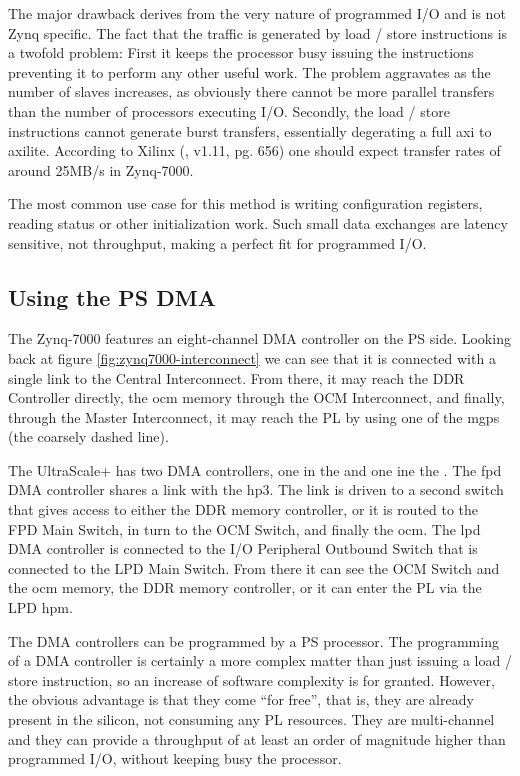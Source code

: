 The major drawback derives from the very nature of programmed I/O and is not Zynq specific.
The fact that the traffic is generated by load / store instructions is a twofold problem:
First it keeps the processor busy issuing the instructions preventing it 
to perform any other useful work. The problem aggravates as the number of slaves increases,
as obviously there cannot be more parallel transfers than the number of processors executing I/O.
Secondly, the load / store instructions cannot generate \gls{burst} transfers,
essentially degerating a full \gls{axi} to \gls{axilite}. 
According to Xilinx (\cite{ug585}, v1.11, pg. 656) one should expect 
transfer rates of around 25MB/s in Zynq-7000.

The most common use case for this method is writing configuration registers,
reading status or other initialization work. 
Such small data exchanges are latency sensitive, not throughput,
making a perfect fit for programmed I/O.

\subsection{Using the PS DMA}

The Zynq-7000 features an eight-channel DMA controller on the PS side.
Looking back at figure \ref{fig:zynq7000-interconnect} we can see that it is connected
with a single link to the Central Interconnect. 
From there, it may reach the DDR Controller directly, the \gls{ocm} memory through the
OCM Interconnect, and finally, through the Master Interconnect, it may reach the PL by
using one of the \glspl{mgp} (the coarsely dashed line). 

The UltraScale+ has two DMA controllers, one in the  and one
ine the . 
The \gls{fpd} DMA controller shares a link with the \gls{hp}3. The link
is driven to a second switch that gives access to either the DDR memory controller,
or it is routed to the FPD Main Switch, in turn to the OCM Switch, and finally the \gls{ocm}.
The \gls{lpd} DMA controller is connected to the I/O Peripheral Outbound Switch that is
connected to the LPD Main Switch. From there it can see the OCM Switch and the \gls{ocm} memory,
the DDR memory controller, or it can enter the PL via the LPD \gls{hpm}.

The DMA controllers can be programmed by a PS processor. The programming of a DMA controller
is certainly a more complex matter than just issuing a load / store instruction,
so an increase of software complexity is for granted. 
However, the obvious advantage is that they come ``for free'', that is,
they are already present in the silicon, not consuming any PL resources.
They are multi-channel and they can provide a throughput of at least an order
of magnitude higher than programmed I/O, without keeping busy the processor.

